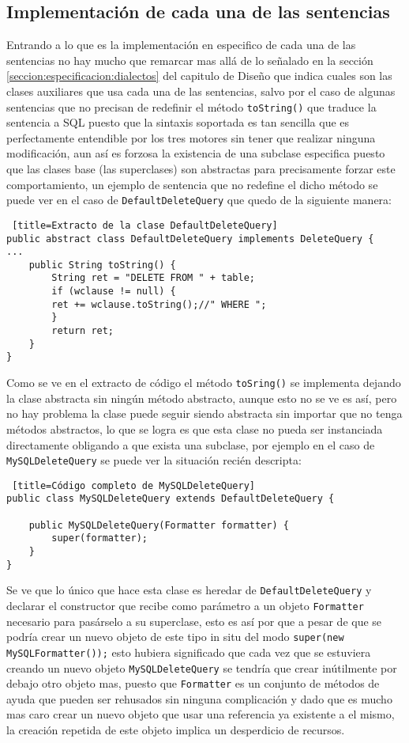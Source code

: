 \subsection{Implementación de cada una de las sentencias}
%
Entrando a lo que es la implementación en especifico de cada una de las sentencias no hay mucho que remarcar mas allá de lo señalado en la sección \ref{seccion:especificacion:dialectos} del capitulo de Diseño que indica cuales son las clases auxiliares que usa cada una de las sentencias, salvo por el caso de algunas sentencias que no precisan de redefinir el método \verb=toString()= que traduce la sentencia a SQL puesto que la sintaxis soportada es tan sencilla que es perfectamente entendible por los tres motores sin tener que realizar ninguna modificación, aun así es forzosa la existencia de una subclase especifica puesto que las clases base (las superclases) son abstractas para precisamente forzar este comportamiento, un ejemplo de sentencia que no redefine el dicho método se puede ver en el caso de \verb=DefaultDeleteQuery= que quedo de la siguiente manera:
%
\begin{lstlisting} [title=Extracto de la clase DefaultDeleteQuery]
public abstract class DefaultDeleteQuery implements DeleteQuery {
...
	public String toString() {
		String ret = "DELETE FROM " + table;
		if (wclause != null) {
		ret += wclause.toString();//" WHERE ";
		}
		return ret;
	}
}
\end{lstlisting}
%
Como se ve en el extracto de código el método \verb=toSring()= se implementa dejando la clase abstracta sin ningún método abstracto, aunque esto no se ve es así, pero no hay problema la clase puede seguir siendo abstracta sin importar que no tenga métodos abstractos, lo que se logra es que esta clase no pueda ser instanciada directamente obligando a que exista una subclase, por ejemplo en el caso de \verb=MySQLDeleteQuery= se puede ver la situación recién descripta:
%
\begin{lstlisting} [title=Código completo de MySQLDeleteQuery]
public class MySQLDeleteQuery extends DefaultDeleteQuery {

	public MySQLDeleteQuery(Formatter formatter) {
		super(formatter);
	}
}
\end{lstlisting}
%

Se ve que lo único que hace esta clase es heredar de \verb=DefaultDeleteQuery= y declarar el constructor que recibe como parámetro a un objeto \verb=Formatter= necesario para pasárselo a su superclase, esto es así por que a pesar de que se podría crear un nuevo objeto de este tipo in situ del modo \verb=super(new MySQLFormatter());= esto hubiera significado que cada vez que se estuviera creando un nuevo objeto \verb=MySQLDeleteQuery= se tendría que crear inútilmente por debajo otro objeto mas, puesto que \verb=Formatter= es un conjunto de métodos de ayuda que pueden ser rehusados sin ninguna complicación y dado que es mucho mas caro crear un nuevo objeto que usar una referencia ya existente a el mismo, la creación repetida de este objeto implica un desperdicio de recursos.

